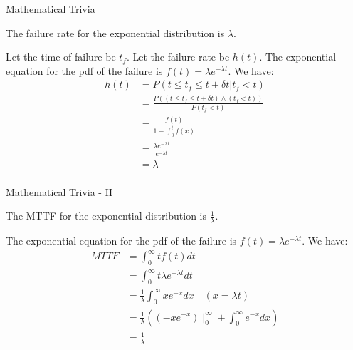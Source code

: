 \documentclass[xcolor=pdftex,dvipsnames,table,svgnames,x11names]{beamer}
\begin{document}
\begin{frame}[shrink]{Mathematical Trivia}
 \begin{Theorem}
  The failure rate for the exponential distribution is $\lambda$. 
 \end{Theorem}
\begin{Proof}
 Let the time of failure be $t_f$. Let the failure rate be $h(t)$. The exponential
equation for the pdf of the failure is $f(t) = \lambda e^{-\lambda t}$. We have:
\begin{equation}
\begin{split}
  h(t) & = P(t \le t_f \le t + \delta t  | t_f < t)  \\
       & = \frac{P( (t \le t_f \le t + \delta t) \wedge (t_f < t) )}{P(t_f < t) } \\
       & = \frac{f(t)}{1- \int_0^t f(x)} \\
       & = \frac{\lambda e^{-\lambda t}}{e^{-\lambda t}} \\
       & = \lambda \\
 \end{split}
\end{equation}

\end{Proof}
\end{frame}


\begin{frame}[shrink]{Mathematical Trivia - II}
 \begin{Theorem}
  The MTTF for the exponential distribution is $\frac{1}{\lambda}$. 
 \end{Theorem}
\begin{Proof}
 The exponential
equation for the pdf of the failure is $f(t) = \lambda e^{-\lambda t}$. We have:
\begin{equation}
\begin{split}
  MTTF &= \int_0^{\infty} t f(t) dt \\
    &= \int_0^{\infty} t \lambda e^{-\lambda t} dt \\
    &= \frac{1}{\lambda} \int_0^{\infty} x e^{-x} dx \quad (x=\lambda t) \\
    &= \frac{1}{\lambda} \left ( (-x e^{-x})  \mid_0^{\infty} +  \int_0^{\infty} e^{-x} dx \right ) \\
    &= \frac{1}{\lambda} \\
 \end{split}
\end{equation}
\end{Proof}
\end{frame}
\end{document}
